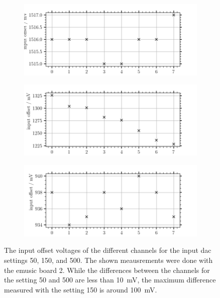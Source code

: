 \begin{figure}
	\centering
	\begin{subfigure}[b]{1.\textwidth}
		\centering
		\includegraphics[width=1.\textwidth]{pictures/input_offset_b2_dac50}
		\caption{}
		\label{fig:input_offset_b2_dac50}
	\end{subfigure}
	
	\begin{subfigure}[b]{1.\textwidth}
		\centering
		\includegraphics[width=1.\textwidth]{pictures/input_offset_b2_dac150}
		\caption{}
		\label{fig:input_offset_b2_dac150}
	\end{subfigure}

	\begin{subfigure}[b]{1.\textwidth}
		\centering
		\includegraphics[width=1.\textwidth]{pictures/input_offset_b2_dac500}
		\caption{}
		\label{fig:input_offset_b2_dac500}
	\end{subfigure}
	\caption[Input offset voltage of all channels for differen \ac{dac} settings]{The input offset voltages of the different channels for the input \ac{dac} settings 50, 150, and 500. The shown meausrements were done with the \ac{emusic} board 2. While the differences between the channels for the setting 50 and 500 are less than \SI{10}{\milli\volt}, the maximum difference measured with the setting 150 is around \SI{100}{\milli\volt}.}
	\label{fig:input_offset_b2_dac}
\end{figure}

